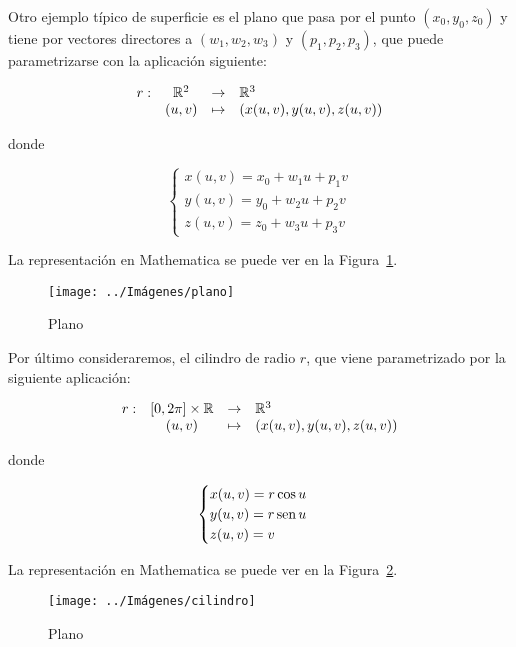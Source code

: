 \documentclass[10pt,a4paper]{article}
\begin{document}
\begin{ejemplo}[Plano]
Otro ejemplo típico de superficie es el plano que pasa por el punto $(x_0, y_0, z_0)$ y tiene por vectores directores a  $(w_1, w_2, w_3)$ y $(p_1, p_2, p_3)$, que puede parametrizarse con la aplicación siguiente:


$$\begin{array}{rcll}
	r : & \mathbb{R}^2 & \to & \mathbb{R}^3\\
		& (u,v) & \mapsto & (x(u,v), y(u,v), z(u,v))
\end{array}$$
		
donde 

$$\begin{cases}
x(u,v) = x_0 + w_1 u + p_1 v \\
y(u,v) = y_0 + w_2 u + p_2 v \\
z(u,v) = z_0 + w_3 u + p_3 v
\end{cases}$$

La representación en Mathematica se puede ver en la Figura~\ref{fig:plano}.

\begin{figure}[thbp]
	\centering
	\texttt{[image: ../Imágenes/plano]}
	\caption{Plano}
	\label{fig:plano}
\end{figure}

\end{ejemplo}

\begin{ejemplo}[Cilindro]
Por último consideraremos, el cilindro de radio $r$, que viene parametrizado por la siguiente aplicación:


$$\begin{array}{rcll}
	r : & [0, 2\pi] \times \mathbb{R} & \to & \mathbb{R}^3\\
		& (u,v) & \mapsto & (x(u,v), y(u,v), z(u,v))
\end{array}$$
		
donde 

$$\begin{cases}
x(u,v) = r \cos u  \\
y(u,v) = r \mathop{\mbox{\normalfont sen}}\nolimits u \\
z(u,v) = v
\end{cases}$$

La representación en Mathematica se puede ver en la Figura~\ref{fig:cilindro}.

\begin{figure}[thbp]
	\centering
	\texttt{[image: ../Imágenes/cilindro]}
	\caption{Plano}
	\label{fig:cilindro}
\end{figure}

\end{ejemplo}
\end{document}
